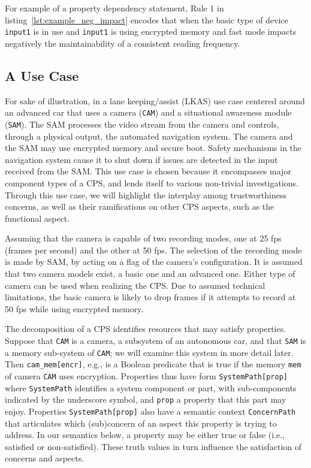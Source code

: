 %
For example of a property dependency statement, Rule 1 in listing~\ref{lst:example_neg_impact} encodes that when the basic type of device {\tt input1} is in use and {\tt input1} is using encrypted memory and fast mode impacts negatively the maintainability of a consistent reading frequency. %
%
\subsection{A Use Case}
\label{sub-section:use_case}
%
For sake of illustration, in a lane keeping/assist (LKAS) use case centered around an advanced car that uses a camera ({\tt CAM}) and a situational awareness module ({\tt SAM}). The SAM processes the video stream from the camera and controls, through a physical output, the automated navigation system. The camera and the SAM may use encrypted memory and secure boot. Safety mechanisms in the navigation system cause it to shut down if issues are detected in the input received from the SAM. This use case is chosen because it encompasses major component types of a CPS, and lends itself to various non-trivial investigations. Through this use case, we will highlight the interplay among trustworthiness concerns, as well as their ramifications on other CPS aspects, such as the functional aspect.
%

Assuming that the camera is capable of two recording modes, one at 25 fps (frames per second) and the other at 50 fps. The selection of the recording mode is made by SAM, by acting on a flag of the camera's configuration. It is assumed that two camera models exist, a basic one and an advanced one. Either type of camera can be used when realizing the CPS. Due to assumed technical limitations, the basic camera is likely to drop frames if it attempts to record at 50 fps while using encrypted memory.
%

The decomposition of a CPS identifies resources that may satisfy properties. Suppose that {\tt CAM} is a camera, a subsystem of an autonomous car, and that {\tt SAM} is a memory sub-system of {\tt CAM}; we will examine this system in more detail later. Then {\tt cam\_mem[encr]}, e.g., is a Boolean predicate that is true if the memory {\tt mem} of camera {\tt CAM} uses encryption. Properties thus have form {\tt SystemPath[prop]} where {\tt SystemPath} identifies a system component or part, with sub-components indicated by the underscore symbol, and {\tt prop} a property that this part may enjoy. 
Properties {\tt SystemPath[prop]} also have a semantic context {\tt ConcernPath} that articulates which (sub)concern of an aspect this property is trying to address.
In our semantics below, a property may be either true or false (i.e., satisfied or non-satisfied). These truth values in turn influence the satisfaction of concerns and aspects.
%